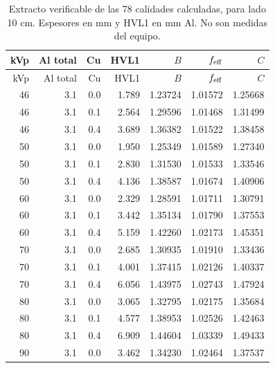 \begin{longtable}{rrrrrrr}
\caption{Extracto verificable de las 78 calidades calculadas, para lado 10 cm. Espesores en mm y HVL1 en mm Al. No son medidas del equipo.}\label{tab:78}\\
\toprule kVp & Al total & Cu & HVL1 & $B$ & $f_{\rm eff}$ & $C$\\\midrule\endfirsthead
\toprule kVp & Al total & Cu & HVL1 & $B$ & $f_{\rm eff}$ & $C$\\\midrule\endhead
\bottomrule\endfoot
\num{46} & \num{3.1} & \num{0.0} & \num{1.789} & \num{1.23724} & \num{1.01572} & \num{1.25668}\\
\num{46} & \num{3.1} & \num{0.1} & \num{2.564} & \num{1.29596} & \num{1.01468} & \num{1.31499}\\
\num{46} & \num{3.1} & \num{0.4} & \num{3.689} & \num{1.36382} & \num{1.01522} & \num{1.38458}\\
\num{50} & \num{3.1} & \num{0.0} & \num{1.950} & \num{1.25349} & \num{1.01589} & \num{1.27340}\\
\num{50} & \num{3.1} & \num{0.1} & \num{2.830} & \num{1.31530} & \num{1.01533} & \num{1.33546}\\
\num{50} & \num{3.1} & \num{0.4} & \num{4.136} & \num{1.38587} & \num{1.01674} & \num{1.40906}\\
\num{60} & \num{3.1} & \num{0.0} & \num{2.329} & \num{1.28591} & \num{1.01711} & \num{1.30791}\\
\num{60} & \num{3.1} & \num{0.1} & \num{3.442} & \num{1.35134} & \num{1.01790} & \num{1.37553}\\
\num{60} & \num{3.1} & \num{0.4} & \num{5.159} & \num{1.42260} & \num{1.02173} & \num{1.45351}\\
\num{70} & \num{3.1} & \num{0.0} & \num{2.685} & \num{1.30935} & \num{1.01910} & \num{1.33436}\\
\num{70} & \num{3.1} & \num{0.1} & \num{4.001} & \num{1.37415} & \num{1.02126} & \num{1.40337}\\
\num{70} & \num{3.1} & \num{0.4} & \num{6.056} & \num{1.43975} & \num{1.02743} & \num{1.47924}\\
\num{80} & \num{3.1} & \num{0.0} & \num{3.065} & \num{1.32795} & \num{1.02175} & \num{1.35684}\\
\num{80} & \num{3.1} & \num{0.1} & \num{4.577} & \num{1.38953} & \num{1.02526} & \num{1.42463}\\
\num{80} & \num{3.1} & \num{0.4} & \num{6.909} & \num{1.44604} & \num{1.03339} & \num{1.49433}\\
\num{90} & \num{3.1} & \num{0.0} & \num{3.462} & \num{1.34230} & \num{1.02464} & \num{1.37537}\\

\end{longtable}
